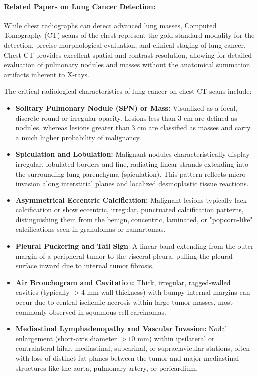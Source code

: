 \paragraph{Related Papers on Lung Cancer Detection:}
While chest radiographs can detect advanced lung masses, Computed Tomography (CT) scans of the chest represent the gold standard modality for the detection, precise morphological evaluation, and clinical staging of lung cancer. Chest CT provides excellent spatial and contrast resolution, allowing for detailed evaluation of pulmonary nodules and masses without the anatomical summation artifacts inherent to X-rays. 

The critical radiological characteristics of lung cancer on chest CT scans include:

\begin{itemize}
	\item \textbf{Solitary Pulmonary Nodule (SPN) or Mass:} Visualized as a focal, discrete round or irregular opacity. Lesions less than 3 cm are defined as nodules, whereas lesions greater than 3 cm are classified as masses and carry a much higher probability of malignancy.
	\item \textbf{Spiculation and Lobulation:} Malignant nodules characteristically display irregular, lobulated borders and fine, radiating linear strands extending into the surrounding lung parenchyma (spiculation). This pattern reflects micro-invasion along interstitial planes and localized desmoplastic tissue reactions.
	\item \textbf{Asymmetrical Eccentric Calcification:} Malignant lesions typically lack calcification or show eccentric, irregular, punctuated calcification patterns, distinguishing them from the benign, concentric, laminated, or "popcorn-like" calcifications seen in granulomas or hamartomas.
	\item \textbf{Pleural Puckering and Tail Sign:} A linear band extending from the outer margin of a peripheral tumor to the visceral pleura, pulling the pleural surface inward due to internal tumor fibrosis.
	\item \textbf{Air Bronchogram and Cavitation:} Thick, irregular, ragged-walled cavities (typically $>4$ mm wall thickness) with bumpy internal margins can occur due to central ischemic necrosis within large tumor masses, most commonly observed in squamous cell carcinomas.
	\item \textbf{Mediastinal Lymphadenopathy and Vascular Invasion:} Nodal enlargement (short-axis diameter $>10$ mm) within ipsilateral or contralateral hilar, mediastinal, subcarinal, or supraclavicular stations, often with loss of distinct fat planes between the tumor and major mediastinal structures like the aorta, pulmonary artery, or pericardium.
\end{itemize}

